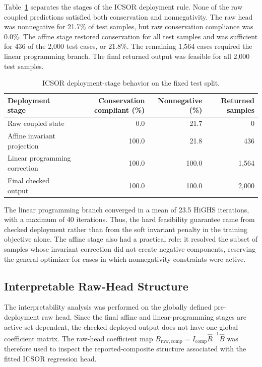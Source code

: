 \documentclass[12pt, twoside]{book}
\begin{document}
Table~\ref{tab:ch3_deployment_stages} separates the stages of the ICSOR deployment rule. None of the raw
coupled predictions satisfied both conservation and nonnegativity. The raw head was nonnegative for 21.7\% of
test samples, but raw conservation compliance was 0.0\%. The affine stage restored conservation for all test
samples and was sufficient for 436 of the 2,000 test cases, or 21.8\%. The remaining 1,564 cases required the
linear programming branch. The final returned output was feasible for all 2,000 test samples.

\begin{table}[htbp]
\centering
\caption{ICSOR deployment-stage behavior on the fixed test split.}
\label{tab:ch3_deployment_stages}
\scriptsize
\setlength{\tabcolsep}{5pt}
\begin{tabular}{lrrr}
\toprule
Deployment stage & Conservation compliant (\%) & Nonnegative (\%) & Returned samples \\
\midrule
Raw coupled state & 0.0 & 21.7 & 0 \\
Affine invariant projection & 100.0 & 21.8 & 436 \\
Linear programming correction & 100.0 & 100.0 & 1,564 \\
Final checked output & 100.0 & 100.0 & 2,000 \\
\bottomrule
\end{tabular}
\end{table}

The linear programming branch converged in a mean of 23.5 HiGHS iterations, with a maximum of 40 iterations.
Thus, the hard feasibility guarantee came from checked deployment rather than from the soft invariant penalty
in the training objective alone. The affine stage also had a practical role: it resolved the subset of samples
whose invariant correction did not create negative components, reserving the general optimizer for cases in
which nonnegativity constraints were active.

\subsection{Interpretable Raw-Head Structure}

The interpretability analysis was performed on the globally defined pre-deployment raw head. Since the final
affine and linear-programming stages are active-set dependent, the checked deployed output does not have one
global coefficient matrix. The raw-head coefficient map
\(B_{\mathrm{raw,comp}}=I_{\mathrm{comp}}\widehat{R}^{-1}\widehat{B}\) was therefore used to inspect the
reported-composite structure associated with the fitted ICSOR regression head.
\end{document}
